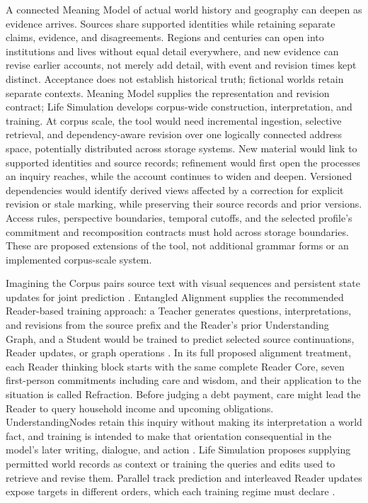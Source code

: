 \documentclass[11pt,a4paper]{article}
\begin{document}
A connected Meaning Model of actual world history and geography can deepen as
evidence arrives. Sources share supported identities while retaining separate
claims, evidence, and disagreements. Regions and centuries can open into
institutions and lives without equal detail everywhere, and new evidence can
revise earlier accounts, not merely add detail, with event and revision times
kept distinct. Acceptance does not establish historical truth; fictional worlds
retain separate contexts. Meaning Model supplies the representation and
revision contract; Life Simulation develops corpus-wide construction,
interpretation, and training. At corpus scale, the tool would need incremental
ingestion, selective retrieval, and dependency-aware revision over one logically
connected address space, potentially distributed across storage systems. New
material would link to supported identities and source records; refinement
would first open the processes an inquiry reaches, while the account continues
to widen and deepen. Versioned dependencies
would identify derived views affected by a correction for explicit revision or
stale marking, while preserving their source records and prior versions. Access rules, perspective boundaries, temporal
cutoffs, and the selected profile's commitment and recomposition contracts must
hold across storage boundaries. These are proposed extensions of the tool, not
additional grammar forms or an implemented corpus-scale system.

Imagining the Corpus pairs source text with visual sequences and persistent
state updates for joint prediction \cite{westerbergImagining2026}. Entangled
Alignment supplies the recommended Reader-based training approach: a Teacher
generates questions, interpretations, and revisions from the source prefix and
the Reader's prior Understanding Graph, and a Student would be trained to
predict selected source continuations, Reader updates, or graph operations
\cite{westerbergEntangled2026}. In its full proposed alignment treatment, each Reader
thinking block starts with the same complete Reader Core, seven first-person
commitments including care and wisdom, and their application to the situation is
called Refraction. Before judging a debt payment, care might lead the Reader to
query household income and upcoming obligations. UnderstandingNodes retain this
inquiry without making its interpretation a world fact, and training is intended
to make that orientation consequential in the model's later writing, dialogue,
and action \cite{westerbergEntangled2026,westerbergLifeSimulation2026}. Life
Simulation proposes supplying permitted world records as context or training
the queries and edits used to retrieve and revise them. Parallel track
prediction and interleaved Reader updates expose targets in different orders,
which each training regime must declare \cite{westerbergLifeSimulation2026}.
\end{document}
